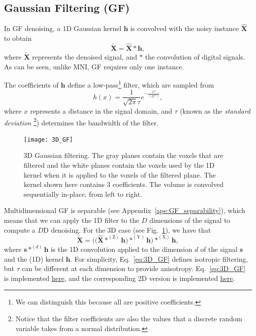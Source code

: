 \documentclass{article}
\begin{document}

\subsection{Gaussian Filtering (GF)}

In GF denoising, a 1D Gaussian kernel $\mathbf{h}$ is convolved with
the noisy instance $\hat{\mathbf{X}}$ to obtain
\begin{equation}
  \tilde{\mathbf{X}} = \hat{\mathbf{X}}*\mathbf{h},
  \label{eq:GF}
\end{equation}
where $\tilde{\mathbf{X}}$ represents the denoised signal, and $*$ the
convolution of digital signals. As can be seen, unlike MNI, GF
requires only one instance.

The coefficients of $\mathbf{h}$ define a low-pass\footnote{We can
  distinguish this because all are positive coefficients.}
filter, which are sampled from
\begin{equation}
  h(x) = \frac{1}{\sqrt{2\pi}\tau}e^{-\frac{{x}^2}{(2\tau^2)}},
  \label{eq:GK}
\end{equation}
where $x$ represents a distance in
the signal domain, and $\tau$ (known as the \emph{standard deviation}
\footnote{Notice that the filter coefficients are also the values that a
  discrete random variable takes from a normal distribution.})
determines the bandwidth of the filter.

\begin{figure}
  \centering
  \texttt{[image: 3D\_GF]}
  \caption{3D Gaussian filtering. The gray planes contain the voxels
    that are filtered and the white planes contain the voxels used by
    the 1D kernel when it is applied to the voxels of the filtered
    plane. The kernel shown here contains 3 coefficients. The volume
    is convolved sequentially in-place, from left to
    right.\label{fig:3D_GF}}
\end{figure}

Multidimensional GF is separable (see
Appendix~\ref{ape:GF_separability}), which means that we
can apply the 1D filter to the $D$ dimensions of the signal to compute
a $D$D denoising. For the 3D case (see Fig.~\ref{fig:3D_GF}), we have
that
\begin{equation}
  \tilde{\mathbf{X}} = \Big(\big(\hat{\mathbf X}*^{(\text{Z})}{\mathbf h}\big)*^{(\text{Y})}{\mathbf h}\Big)*^{(\text{X})}{\mathbf h},
    \label{eq:3D_GF}
\end{equation}
where ${\mathbf s}*^{(d)}{\mathbf h}$ is the 1D convolution applied to
the dimension $d$ of the signal ${\mathbf s}$ and the (1D) kernel
${\mathbf h}$. For simplicity, Eq.~\ref{eq:3D_GF} defines isotropic
filtering, but $\tau$ can be different at each dimension to provide
anisotropy. Eq.~\ref{eq:3D_GF} is implemented
\href{https://github.com/vicente-gonzalez-ruiz/denoising/blob/main/src/denoising/volume/gaussian.py}{here},
and the corresponding 2D version is implemented
\href{https://github.com/vicente-gonzalez-ruiz/denoising/blob/main/src/denoising/image/gaussian.py}{here}.
\end{document}
